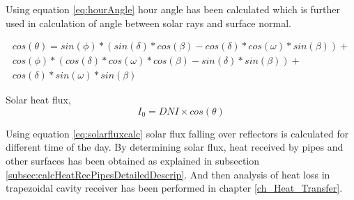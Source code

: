 Using equation \ref{eq:hourAngle} hour angle has been calculated which is further used in calculation of angle between solar rays and surface normal.

\begin{multline}
cos(\theta) = sin(\phi)*(sin(\delta)*cos(\beta)-cos(\delta)*cos(\omega)*sin(\beta))+\\
cos(\phi)*(cos(\delta)*cos(\omega)*cos(\beta)-sin(\delta)*sin(\beta))+ \\
cos(\delta)*sin(\omega)*sin(\beta)
\end{multline}

Solar heat flux,
\begin{equation}\label{eq:solarfluxcalc}
I_{0} = DNI\times cos(\theta)
\end{equation}

Using equation \ref{eq:solarfluxcalc} solar flux falling over reflectors is calculated  for different time of the day. By determining solar flux, heat received by pipes and other surfaces has been obtained as explained in subsection \ref{subsec:calcHeatRecPipesDetailedDescrip}. And then analysis of heat loss in trapezoidal cavity receiver has been performed in chapter \ref{ch_Heat_Transfer}.











